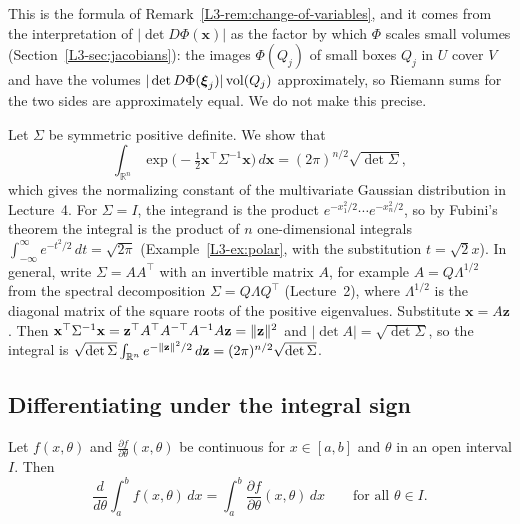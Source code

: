 This is the formula of Remark~\ref{L3-rem:change-of-variables}, and it comes from the interpretation of $|\det D\Phi(\mathbf{x})|$ as the factor by which $\Phi$ scales small volumes (Section~\ref{L3-sec:jacobians}): the images $\Phi(Q_j)$ of small boxes $Q_j$ in $U$ cover $V$ and have the volumes $|\det D\Phi(\boldsymbol{\xi}_j)|\operatorname{vol}(Q_j)$ approximately, so Riemann sums for the two sides are approximately equal. We do not make this precise.

\begin{example}\label{L3-ex:gauss-integral}
    Let $\Sigma$ be symmetric positive definite. We show that
    \[\int_{\mathbb{R}^n} \exp\big(-\tfrac{1}{2}\mathbf{x}^\top\Sigma^{-1}\mathbf{x}\big)\, d\mathbf{x} = (2\pi)^{n/2}\sqrt{\det\Sigma},\]
    which gives the normalizing constant of the multivariate Gaussian distribution in Lecture~4. For $\Sigma = I$, the integrand is the product $e^{-x_1^2/2}\cdots e^{-x_n^2/2}$, so by Fubini's theorem the integral is the product of $n$ one-dimensional integrals $\int_{-\infty}^\infty e^{-t^2/2}\, dt = \sqrt{2\pi}$ (Example~\ref{L3-ex:polar}, with the substitution $t = \sqrt{2}x$). In general, write $\Sigma = AA^\top$ with an invertible matrix $A$, for example $A = Q\Lambda^{1/2}$ from the spectral decomposition $\Sigma = Q\Lambda Q^\top$ (Lecture~2), where $\Lambda^{1/2}$ is the diagonal matrix of the square roots of the positive eigenvalues. Substitute $\mathbf{x} = A\mathbf{z}$. Then $\mathbf{x}^\top\Sigma^{-1}\mathbf{x} = \mathbf{z}^\top A^\top A^{-\top}A^{-1}A\mathbf{z} = \lVert \mathbf{z} \rVert^2$ and $|\det A| = \sqrt{\det\Sigma}$, so the integral is $\sqrt{\det\Sigma}\int_{\mathbb{R}^n} e^{-\lVert \mathbf{z} \rVert^2/2}\, d\mathbf{z} = (2\pi)^{n/2}\sqrt{\det\Sigma}$.
\end{example}

\subsection{Differentiating under the integral sign}

\begin{proposition}\label{L3-prop:leibniz}
    Let $f(x, \theta)$ and $\frac{\partial f}{\partial\theta}(x, \theta)$ be continuous for $x \in [a, b]$ and $\theta$ in an open interval $I$. Then
    \[\frac{d}{d\theta}\int_a^b f(x, \theta)\, dx = \int_a^b \frac{\partial f}{\partial\theta}(x, \theta)\, dx \qquad \text{for all } \theta \in I.\]
\end{proposition}

